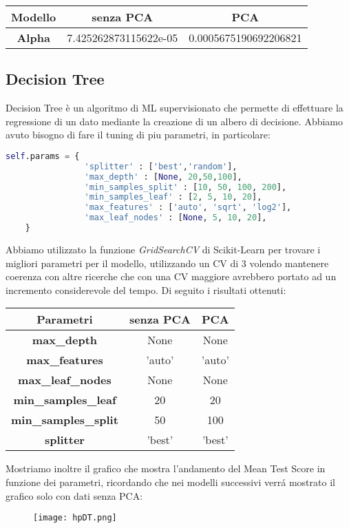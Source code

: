 \documentclass[../../Report.tex]{subfiles}
\begin{document}
\begin{table}[h]
    \centering
    \begin{tabular}{|c|c|c|}
    \hline
\textbf{Modello} & \textbf{senza PCA} & \textbf{PCA} \\ \hline
\textbf{Alpha} &  7.425262873115622e-05 &   0.0005675190692206821 \\ \hline
\end{tabular}
\end{table}
\subsection{Decision Tree}
Decision Tree è un algoritmo di ML supervisionato che permette di effettuare la regressione di un dato mediante la creazione di un albero di decisione.
Abbiamo avuto bisogno di fare il tuning di piu parametri, in particolare:
\begin{lstlisting}[language=Python]
    self.params = {
                'splitter' : ['best','random'],
                'max_depth' : [None, 20,50,100],
                'min_samples_split' : [10, 50, 100, 200],
                'min_samples_leaf' : [2, 5, 10, 20],
                'max_features' : ['auto', 'sqrt', 'log2'],
                'max_leaf_nodes' : [None, 5, 10, 20],
    }
\end{lstlisting}
Abbiamo utilizzato la funzione \textit{GridSearchCV} di Scikit-Learn per trovare i migliori parametri per il modello, utilizzando un CV di 3 volendo mantenere coerenza con altre ricerche che con una CV maggiore avrebbero portato ad un incremento considerevole del tempo.
Di seguito i risultati ottenuti:\\
\begin{table}[H]
    \centering
    \begin{tabular}{|c|c|c|}
    \hline
    \textbf{Parametri} & \textbf{senza PCA} & \textbf{PCA} \\ \hline
    \textbf{max\_depth}& None & None\\
    \textbf{max\_features}& 'auto' &  'auto' \\
    \textbf{max\_leaf\_nodes}& None & None\\
    \textbf{min\_samples\_leaf}& 20 & 20\\
    \textbf{min\_samples\_split}& 50 & 100\\
    \textbf{splitter}& 'best' &  'best'\\
    \hline
\end{tabular}
\end{table}
Mostriamo inoltre il grafico che mostra l'andamento del Mean Test Score in funzione dei parametri, ricordando che nei modelli successivi verrá mostrato il grafico solo con dati senza PCA:
\begin{figure}[H]
    \texttt{[image: hpDT.png]}
    \centering
\end{figure}
\end{document}

